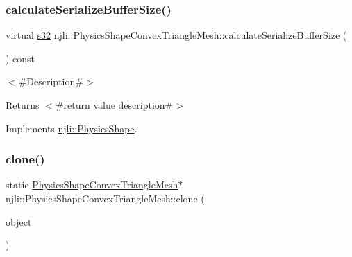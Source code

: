 \mbox{\label{classnjli_1_1_physics_shape_convex_triangle_mesh_abe17d7d9dd1c880e76553e2fc7f6da2b}} 
\subsubsection{\texorpdfstring{calculate\+Serialize\+Buffer\+Size()}{calculateSerializeBufferSize()}}
{\footnotesize\ttfamily virtual \mbox{\hyperlink{_util_8h_aa62c75d314a0d1f37f79c4b73b2292e2}{s32}} njli\+::\+Physics\+Shape\+Convex\+Triangle\+Mesh\+::calculate\+Serialize\+Buffer\+Size (\begin{DoxyParamCaption}{ }\end{DoxyParamCaption}) const\hspace{0.3cm}{\ttfamily [virtual]}}

$<$\#\+Description\#$>$

\begin{DoxyReturn}{Returns}
$<$\#return value description\#$>$ 
\end{DoxyReturn}


Implements \mbox{\hyperlink{classnjli_1_1_physics_shape_a0612a1c8c3f4520d78cb7f5838f03074}{njli\+::\+Physics\+Shape}}.

\mbox{\label{classnjli_1_1_physics_shape_convex_triangle_mesh_ae0f2cc0e5cbff56245424b4235db842c}} 
\subsubsection{\texorpdfstring{clone()}{clone()}}
{\footnotesize\ttfamily static \mbox{\hyperlink{classnjli_1_1_physics_shape_convex_triangle_mesh}{Physics\+Shape\+Convex\+Triangle\+Mesh}}$\ast$ njli\+::\+Physics\+Shape\+Convex\+Triangle\+Mesh\+::clone (\begin{DoxyParamCaption}\item[{const \mbox{\hyperlink{classnjli_1_1_physics_shape_convex_triangle_mesh}{Physics\+Shape\+Convex\+Triangle\+Mesh}} \&}]{object }\end{DoxyParamCaption})\hspace{0.3cm}{\ttfamily [static]}}

